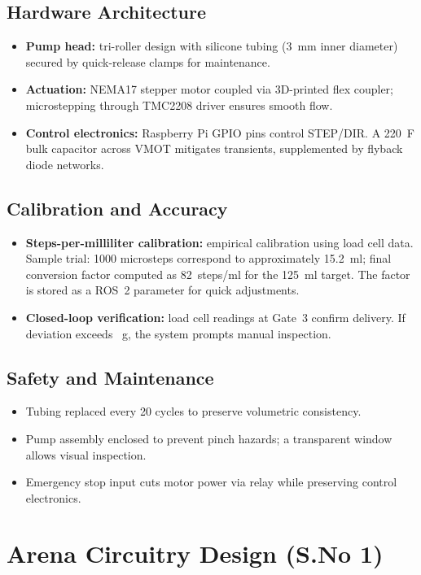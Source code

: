 \documentclass[12pt]{article}
\begin{document}
\subsection{Hardware Architecture}
\begin{itemize}
    \item \textbf{Pump head:} tri-roller design with silicone tubing (3~mm inner diameter) secured by quick-release clamps for maintenance.
    \item \textbf{Actuation:} NEMA17 stepper motor coupled via 3D-printed flex coupler; microstepping through TMC2208 driver ensures smooth flow.
    \item \textbf{Control electronics:} Raspberry Pi GPIO pins control STEP/DIR. A 220~\textmu F bulk capacitor across VMOT mitigates transients, supplemented by flyback diode networks.
\end{itemize}

\subsection{Calibration and Accuracy}
\begin{itemize}
    \item \textbf{Steps-per-milliliter calibration:} empirical calibration using load cell data. Sample trial: 1000 microsteps correspond to approximately 15.2~ml; final conversion factor computed as 82~steps/ml for the 125~ml target. The factor is stored as a ROS~2 parameter for quick adjustments.
    \item \textbf{Closed-loop verification:} load cell readings at Gate~3 confirm delivery. If deviation exceeds ~g, the system prompts manual inspection.
\end{itemize}

\subsection{Safety and Maintenance}
\begin{itemize}
    \item Tubing replaced every 20 cycles to preserve volumetric consistency.
    \item Pump assembly enclosed to prevent pinch hazards; a transparent window allows visual inspection.
    \item Emergency stop input cuts motor power via relay while preserving control electronics.
\end{itemize}

\section{Arena Circuitry Design (S.No 1)}\label{sec:arena}
\end{document}
